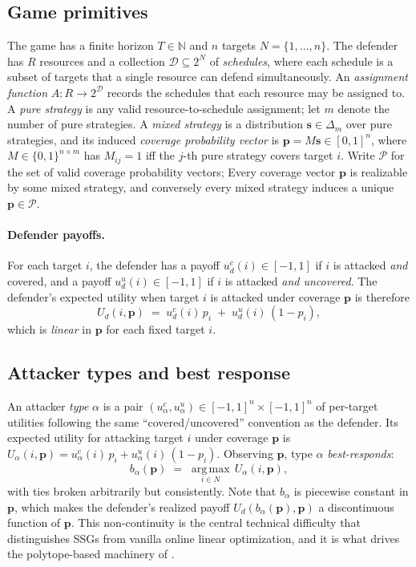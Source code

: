 \documentclass[letterpaper,9pt,twocolumn]{extarticle}
\newcommand{\pvec}{\mathbf{p}}
\newcommand{\svec}{\mathbf{s}}
\newcommand{\cP}{\mathcal{P}}
\newcommand{\NN}{\mathbb{N}}
\newcommand{\argmax}{\operatorname*{arg\,max}}
\theoremstyle{plain}
\theoremstyle{definition}
\theoremstyle{remark}
\begin{document}
\subsection{Game primitives}

The game has a finite horizon $T\in\NN$ and $n$ targets
$N=\{1,\dots,n\}$. The defender has $R$ resources and a collection
$\mathcal{D}\subseteq 2^N$ of \emph{schedules}, where each schedule is a
subset of targets that a single resource can defend simultaneously. An
\emph{assignment function} $A:R\to 2^{\mathcal{D}}$ records the schedules
that each resource may be assigned to. A \emph{pure strategy} is any valid
resource-to-schedule assignment; let $m$ denote the number of pure
strategies. A \emph{mixed strategy} is a distribution $\svec\in\Delta_m$
over pure strategies, and its induced \emph{coverage probability vector}
is $\pvec = M\svec\in [0,1]^n$, where $M\in\{0,1\}^{n\times m}$ has
$M_{ij}=1$ iff the $j$-th pure strategy covers target $i$. Write $\cP$ for
the set of valid coverage probability vectors;  Every coverage vector $\pvec$ is realizable by
some mixed strategy, and conversely every mixed strategy induces a unique
$\pvec\in\cP$.

\paragraph{Defender payoffs.}
For each target $i$, the defender has a payoff
$u_d^c(i)\in[-1,1]$ if $i$ is attacked \emph{and} covered, and a payoff
$u_d^u(i)\in[-1,1]$ if $i$ is attacked \emph{and uncovered}. The
defender's expected utility when target $i$ is attacked under coverage
$\pvec$ is therefore
\begin{equation}
U_d(i,\pvec)\;=\;u_d^c(i)\,p_i \;+\; u_d^u(i)\,(1-p_i),
\label{eq:Ud}
\end{equation}
which is \emph{linear} in $\pvec$ for each fixed target $i$.

\subsection{Attacker types and best response}

An attacker \emph{type} $\alpha$ is a pair
$(u_\alpha^c,u_\alpha^u)\in[-1,1]^n\times[-1,1]^n$ of per-target utilities
following the same ``covered/uncovered'' convention as the defender. Its
expected utility for attacking target $i$ under coverage $\pvec$ is
$
U_\alpha(i,\pvec)=u_\alpha^c(i)\,p_i + u_\alpha^u(i)\,(1-p_i).
$
Observing $\pvec$, type $\alpha$ \emph{best-responds}:
\begin{equation}
b_\alpha(\pvec)\;=\;\argmax_{i\in N}\,U_\alpha(i,\pvec),
\label{eq:br}
\end{equation}
with ties broken arbitrarily but consistently. Note that $b_\alpha$ is
piecewise constant in $\pvec$, which makes the defender's realized payoff
$U_d(b_\alpha(\pvec),\pvec)$ a discontinuous function of $\pvec$. This
non-continuity is the central technical difficulty that distinguishes SSGs
from vanilla online linear optimization, and it is what drives the
polytope-based machinery of \citet{balcan2015}.
\end{document}
